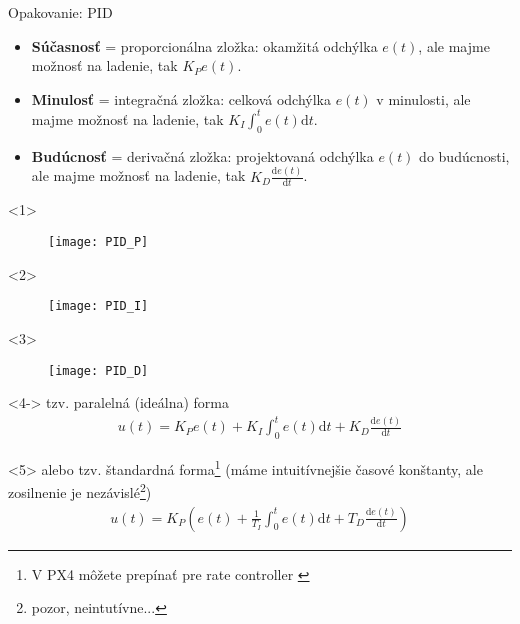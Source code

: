 \begin{frame}[t]{Opakovanie: PID}
  \begin{itemize}
    \item<1-> \textbf{Súčasnosť} = proporcionálna zložka: okamžitá odchýlka $e(t)$, ale majme možnosť na ladenie, tak $K_Pe(t)$.
    \item<2-> \textbf{Minulosť} = integračná zložka: celková odchýlka $e(t)$ v minulosti, ale majme možnosť na ladenie, tak $K_I\int_0^te(t)\mathrm{d}t$.
    \item<3-> \textbf{Budúcnosť} = derivačná zložka: projektovaná odchýlka $e(t)$ do budúcnosti, ale majme možnosť na ladenie, tak $K_D\frac{\mathrm{d}e(t)}{\mathrm{d}t}$.
  \end{itemize}

\begin{onlyenv}<1>
\begin{figure}
\centering
  \texttt{[image: PID\_P]}\\
\end{figure}
\end{onlyenv}

\begin{onlyenv}<2>
\begin{figure}
\centering
  \texttt{[image: PID\_I]}\\
\end{figure}
\end{onlyenv}

\begin{onlyenv}<3>
\begin{figure}
\centering
  \texttt{[image: PID\_D]}\\
\end{figure}
\end{onlyenv}


\begin{onlyenv}<4->
tzv. paralelná (ideálna) forma
\begin{align}
u(t)= K_Pe(t)+K_I\int_0^te(t)\mathrm{d}t+K_D\frac{\mathrm{d}e(t)}{\mathrm{d}t}
\end{align}
\end{onlyenv}

\begin{onlyenv}<5>
alebo tzv. štandardná forma\footnote{V PX4 môžete prepínať pre rate controller \cite{PX4:PIDTuning}} (máme intuitívnejšie časové konštanty, ale zosilnenie je nezávislé\footnote{pozor, neintutívne...})
\begin{align}
u(t)= K_P\left(e(t)+\frac{1}{T_I}\int_0^te(t)\mathrm{d}t+T_D\frac{\mathrm{d}e(t)}{\mathrm{d}t}\right)
\end{align}
\end{onlyenv}
\end{frame}





